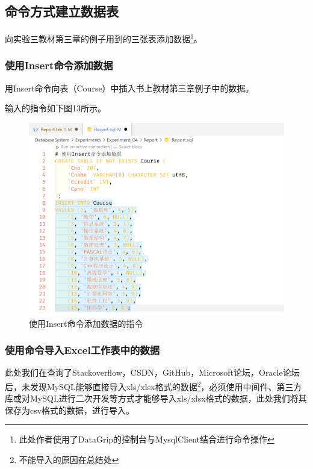 \documentclass[a4paper,UTF8,heading=false,12pt]{article}
\begin{document}
\newpage

\subsection{命令方式建立数据表}

向实验三教材第三章的例子用到的三张表添加数据\footnote{此处作者使用了DataGrip的控制台与MysqlClient结合进行命令操作}。

\subsubsection{使用Insert命令添加数据}

用Insert命令向表（Course）中插入书上教材第三章例子中的数据。

输入的指令如下图13所示。

\begin{figure}[htbp]
    \centering
    \includegraphics[width=15cm]{../Images/InsertCommand_OnImport.png}
    \caption{使用Insert命令添加数据的指令}
\end{figure}

\subsubsection{使用命令导入Excel工作表中的数据}

此处我们在查询了Stackoverflow，CSDN，GitHub，Microsoft论坛，Oracle论坛后，未发现MySQL能够直接导入xls/xlsx格式的数据\footnote{不能导入的原因在总结处}，必须使用中间件、第三方库或对MySQL进行二次开发等方式才能够导入xls/xlsx格式的数据，此处我们将其保存为csv格式的数据，进行导入。
\end{document}
